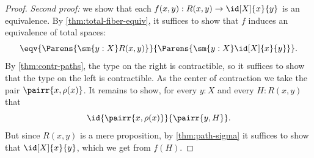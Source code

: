 \begin{proof}
  \emph{Second proof:} we show that each $f(x,y) : R(x,y) \to \id[X]{x}{y}$ is an equivalence.
  By \cref{thm:total-fiber-equiv}, it suffices to show that $f$ induces an equivalence of total spaces:
  \begin{equation*}
    \eqv{\Parens{\sm{y:X}R(x,y)}}{\Parens{\sm{y:X}\id[X]{x}{y}}}.
  \end{equation*}
  By \cref{thm:contr-paths}, the type on the right is contractible, so it
  suffices to show that the type on the left is contractible. As the center of
  contraction we take the pair $\pairr{x,\rho(x)}$.  It remains to show, for
  every ${y:X}$ and every ${H:R(x,y)}$ that
  \begin{equation*}
    \id{\pairr{x,\rho(x)}}{\pairr{y,H}}.
  \end{equation*}
  But since $R(x,y)$ is a mere proposition, by \cref{thm:path-sigma} it suffices to show that
  $\id[X]{x}{y}$, which we get from $f(H)$.
\end{proof}
